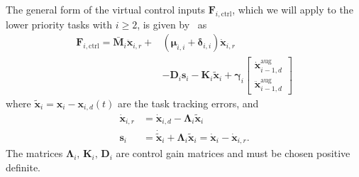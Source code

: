 \documentclass[../main.tex]{subfiles}
\begin{document}
The general form of the virtual control inputs $\bm{F}_{i,\textrm{ctrl}}$, which we will apply to the lower priority tasks with $i\geq 2$, is given by~\cite{Saeboe2022} as
\begin{equation}\label{eq:Fictrl}
    \begin{split}
        \bm{F}_{i,\textrm{ctrl}} = \bar{\bm{M}}_i \ddot{\bm{x}}_{i,r} +& \left( \bm{\mu}_{i,i} + \bm{\delta}_{i,i} \right) \dot{\bm{x}}_{i,r}\\[-5pt]
        &- \bm{D}_i \bm{s}_i - \bm{K}_i \tilde{\bm{x}}_i + \bm{\gamma}_i \begin{bmatrix} \dot{\bm{x}}^{\textrm{aug}}_{i-1,d} \\ \ddot{\bm{x}}^{\textrm{aug}}_{i-1,d}
        \end{bmatrix}
    \end{split}
\end{equation}
where $\tilde{\bm{x}}_i = \bm{x}_i - \bm{x}_{i,d}(t)$ are the task tracking errors, and
\begin{align}
    \dot{\bm{x}}_{i,r} &= \dot{\bm{x}}_{i,d} - \bm{\Lambda}_i \tilde{\bm{x}}_i\\
    \bm{s}_i &=  \dot{\tilde{\bm{x}}}_i + \bm{\Lambda}_i \tilde{\bm{x}}_i = \dot{\bm{x}}_i - \dot{\bm{x}}_{i,r} .\label{eq:si}
\end{align}
The matrices $\bm{\Lambda}_i,\, \bm{K}_i,\, \bm{D}_i$ are control gain matrices and must be chosen positive definite.
\end{document}

